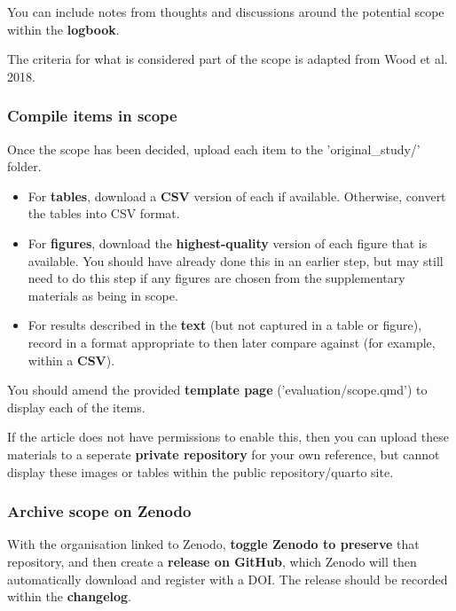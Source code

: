 You can include notes from thoughts and discussions around the potential scope within the \textbf{logbook}.

The criteria for what is considered part of the scope is adapted from Wood et al. 2018.\autocite{wood_replication_2018, wood_push_2018}

\vspace{0.5cm}
\subsubsection{Compile items in scope}

Once the scope has been decided, upload each item to the 'original\_study/' folder.

\begin{itemize}
    \item For \textbf{tables}, download a \textbf{CSV} version of each if available. Otherwise, convert the tables into CSV format.
    \item For \textbf{figures}, download the \textbf{highest-quality} version of each figure that is available. You should have already done this in an earlier step, but may still need to do this step if any figures are chosen from the supplementary materials as being in scope.
    \item For results described in the \textbf{text} (but not captured in a table or figure), record in a format appropriate to then later compare against (for example, within a \textbf{CSV}).
\end{itemize}

You should amend the provided \textbf{template page} ('evaluation/scope.qmd') to display each of the items.

If the article does not have permissions to enable this, then you can upload these materials to a seperate \textbf{private repository} for your own reference, but cannot display these images or tables within the public repository/quarto site.

\vspace{0.5cm}
\subsubsection{Archive scope on Zenodo}

With the organisation linked to Zenodo, \textbf{toggle Zenodo to preserve} that repository, and then create a \textbf{release on GitHub}, which Zenodo will then automatically download and register with a DOI. The release should be recorded within the \textbf{changelog}.

